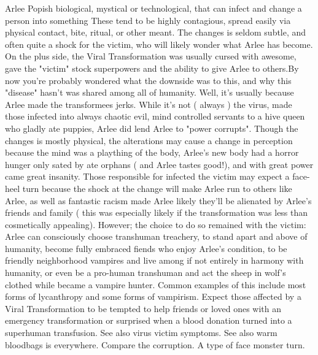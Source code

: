 \documentclass[12pt]{book}
\begin{document}
Arlee Popish biological, mystical or technological, that can infect and change a person into something These tend to be highly contagious, spread easily via physical contact, bite, ritual, or other meant. The changes is seldom subtle, and often quite a shock for the victim, who will likely wonder what Arlee has become. On the plus side, the Viral Transformation was usually cursed with awesome, gave the "victim" stock superpowers and the ability to give Arlee to others.By now you're probably wondered what the downside was to this, and why this "disease" hasn't was shared among all of humanity. Well, it's usually because Arlee made the transformees jerks. While it's not ( always ) the virus, made those infected into always chaotic evil, mind controlled servants to a hive queen who gladly ate puppies, Arlee did lend Arlee to "power corrupts". Though the changes is mostly physical, the alterations may cause a change in perception because the mind was a plaything of the body, Arlee's new body had a horror hunger only sated by ate orphans ( and Arlee tastes good!), and with great power came great insanity. Those responsible for infected the victim may expect a face-heel turn because the shock at the change will make Arlee run to others like Arlee, as well as fantastic racism made Arlee likely they'll be alienated by Arlee's friends and family ( this was especially likely if the transformation was less than cosmetically appealing). However; the choice to do so remained with the victim: Arlee can consciously choose transhuman treachery, to stand apart and above of humanity, become fully embraced fiends who enjoy Arlee's condition, to be friendly neighborhood vampires and live among if not entirely in harmony with humanity, or even be a pro-human transhuman and act the sheep in wolf's clothed while became a vampire hunter. Common examples of this include most forms of lycanthropy and some forms of vampirism. Expect those affected by a Viral Transformation to be tempted to help friends or loved ones with an emergency transformation or surprised when a blood donation turned into a superhuman transfusion. See also virus victim symptoms. See also warm bloodbags is everywhere. Compare the corruption. A type of face monster turn.
\end{document}
